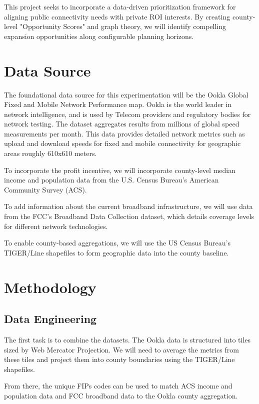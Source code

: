 \documentclass{article}
\begin{document}
This project seeks to incorporate a data-driven prioritization framework for aligning public connectivity needs with private ROI interests. By creating county-level "Opportunity Scores" and graph theory, we will identify compelling expansion opportunities along configurable planning horizons.

\section{Data Source}
            
	The foundational data source for this experimentation will be the Ookla Global Fixed and Mobile Network Performance map. Ookla is the world leader in network intelligence, and is used by Telecom providers and regulatory bodies for network testing. The dataset aggregates results from millions of global speed measurements per month. This data provides detailed network metrics such as upload and download speeds for fixed and mobile connectivity for geographic areas roughly 610x610 meters.

	To incorporate the profit incentive, we will incorporate county-level median income and population data from the U.S. Census Bureau's American Community Survey (ACS).

	To add information about the current broadband infrastructure, we will use data from the FCC's Broadband Data Collection dataset, which details coverage levels for different network technologies.

	To enable county-based aggregations, we will use the US Census Bureau's TIGER/Line shapefiles to form geographic data into the county baseline.

\section{Methodology}
        
\subsection{Data Engineering}

	The first task is to combine the datasets. The Ookla data is structured into tiles sized by Web Mercator Projection. We will need to average the metrics from these tiles and project them into county boundaries using the TIGER/Line shapefiles.
	
	From there, the unique FIPs codes can be used to match ACS income and population data and FCC broadband data to the Ookla county aggregation.
\end{document}

